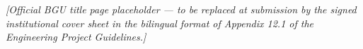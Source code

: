 \begin{titlepage}
\begin{center}
\vspace{0.8em}
\par

\vfill
{\small\itshape [Official BGU title page placeholder --- to be replaced at
submission by the signed institutional cover sheet in the bilingual format
of Appendix 12.1 of the Engineering Project Guidelines.]}\par

\end{center}
\end{titlepage}
